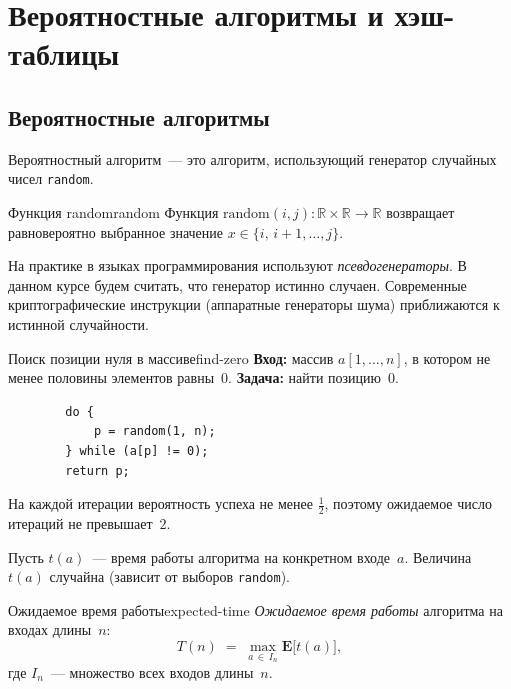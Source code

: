 
\section{Вероятностные алгоритмы и хэш-таблицы}

\subsection{Вероятностные алгоритмы}

Вероятностный алгоритм~--- это алгоритм, использующий генератор случайных чисел
\texttt{random}.

\begin{Definition}{Функция random}{random}
	Функция $\mathrm{random}(i,j)\colon \mathbb{R}\times\mathbb{R}\to\mathbb{R}$
	возвращает равновероятно выбранное значение $x\in\{i,\,i{+}1,\ldots,j\}$.
\end{Definition}

\begin{Remark}{}{}
	На практике в языках программирования используют \emph{псевдогенераторы}.
	В данном курсе будем считать, что генератор истинно случаен.
	Современные криптографические инструкции (аппаратные генераторы шума) приближаются
	к истинной случайности.
\end{Remark}

\begin{Example}{Поиск позиции нуля в массиве}{find-zero}
	\textbf{Вход:} массив $a[1,\ldots,n]$, в котором не менее половины элементов равны~$0$.
	\textbf{Задача:} найти позицию~$0$.
	
	\begin{verbatim}
		do {
			p = random(1, n);
		} while (a[p] != 0);
		return p;
	\end{verbatim}
	
	На каждой итерации вероятность успеха не менее $\tfrac{1}{2}$,
	поэтому ожидаемое число итераций не превышает~$2$.
\end{Example}

Пусть $t(a)$~--- время работы алгоритма на конкретном входе~$a$.
Величина $t(a)$ случайна (зависит от выборов \texttt{random}).

\begin{Definition}{Ожидаемое время работы}{expected-time}
	\emph{Ожидаемое время работы} алгоритма на входах длины~$n$:
	\[
	T(n) \;=\; \max_{a\,\in\, I_n} \mathbf{E}\bigl[t(a)\bigr],
	\]
	где $I_n$~--- множество всех входов длины~$n$.
\end{Definition}

